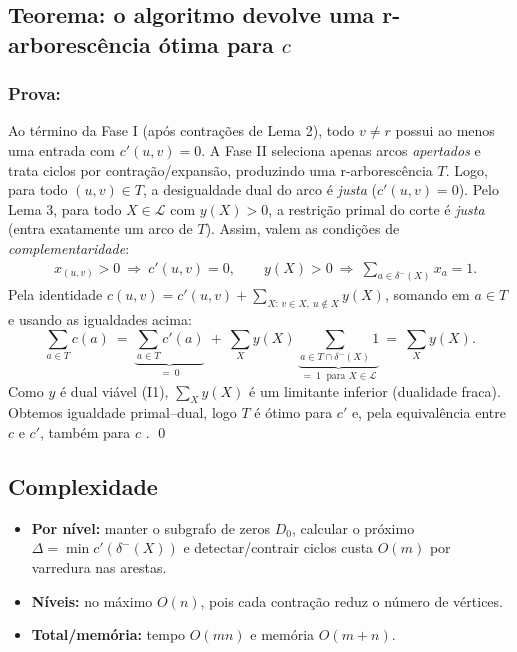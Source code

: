\subsection{Teorema: o algoritmo devolve uma r-arborescência ótima para \(c\)}

\subsubsection{Prova:}
Ao término da Fase I (após contrações de Lema 2), todo \(v\neq r\) possui ao menos uma entrada com \(c'(u,v)=0\). A Fase II seleciona apenas arcos \emph{apertados} e trata ciclos por contração/expansão, produzindo uma r-arborescência \(T\). Logo, para todo \((u,v)\in T\), a desigualdade dual do arco é \emph{justa} (\(c'(u,v)=0\)). Pelo Lema 3, para todo \(X\in\mathcal{L}\) com \(y(X)>0\), a restrição primal do corte é \emph{justa} (entra exatamente um arco de \(T\)). Assim, valem as condições de \emph{complementaridade}:
\begin{align*}
	 & x_{(u,v)}>0\ \Rightarrow\ c'(u,v)=0,\qquad
	y(X)>0\ \Rightarrow\ \sum_{a\in \delta^-(X)} x_a=1.
\end{align*}
Pela identidade \(c(u,v)=c'(u,v)+\sum_{X:\,v\in X,\ u\notin X} y(X)\), somando em \(a\in T\) e usando as igualdades acima:
\[
	\sum_{a\in T} c(a)\ =\ \underbrace{\sum_{a\in T} c'(a)}_{=\ 0}\ +\ \sum_{X} y(X)\,\underbrace{\sum_{a\in T\cap \delta^-(X)} 1}_{=\ 1\ \text{ para } X\in\mathcal{L}}\ =\ \sum_{X} y(X).
\]
Como \(y\) é dual viável (I1), \(\sum_X y(X)\) é um limitante inferior (dualidade fraca). Obtemos igualdade primal–dual, logo \(T\) é ótimo para \(c'\) e, pela equivalência entre \(c\) e \(c'\), também para \(c\) \cite{frank2014,schrijver2003comb}. \qed

\subsection{Complexidade}

\begin{itemize}\setlength{\itemsep}{2pt}
	\item \textbf{Por nível:} manter o subgrafo de zeros \(D_0\), calcular o próximo \(\Delta=\min c'(\delta^-(X))\) e detectar/contrair ciclos custa \(O(m)\) por varredura nas arestas.
	\item \textbf{Níveis:} no máximo \(O(n)\), pois cada contração reduz o número de vértices.
	\item \textbf{Total/memória:} tempo \(O(mn)\) e memória \(O(m+n)\).
\end{itemize}

